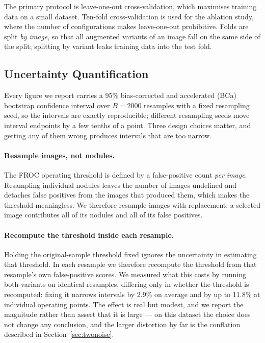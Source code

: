\documentclass[11pt,a4paper]{article}
\begin{document}
The primary protocol is leave-one-out cross-validation, which maximises
training data on a small dataset. Ten-fold cross-validation is used for the
ablation study, where the number of configurations makes leave-one-out
prohibitive. Folds are split \emph{by image}, so that all augmented variants of
an image fall on the same side of the split; splitting by variant leaks
training data into the test fold.

\subsection{Uncertainty Quantification}
\label{sec:bootstrap}

Every figure we report carries a 95\% bias-corrected and accelerated (BCa)
bootstrap confidence interval over $B = 2000$ resamples with a fixed resampling
seed, so the intervals are exactly reproducible; different resampling seeds move
interval endpoints by a few tenths of a point. Three design choices
matter, and getting any of them wrong produces intervals that are too narrow.

\paragraph{Resample images, not nodules.}
The FROC operating threshold is defined by a false-positive count \emph{per
image}. Resampling individual nodules leaves the number of images undefined and
detaches false positives from the images that produced them, which makes the
threshold meaningless. We therefore resample images with replacement; a
selected image contributes all of its nodules and all of its false positives.

\paragraph{Recompute the threshold inside each resample.}
Holding the original-sample threshold fixed ignores the uncertainty in
estimating that threshold. In each resample we therefore recompute the threshold
from that resample's own false-positive scores. We measured what this costs by
running both variants on identical resamples, differing only in whether the
threshold is recomputed: fixing it narrows intervals by 2.9\% on average and by
up to 11.8\% at individual operating points. The effect is real but modest, and
we report the magnitude rather than assert that it is large --- on this dataset
the choice does not change any conclusion, and the larger distortion by far is
the conflation described in Section~\ref{sec:twonoise}.
\end{document}
